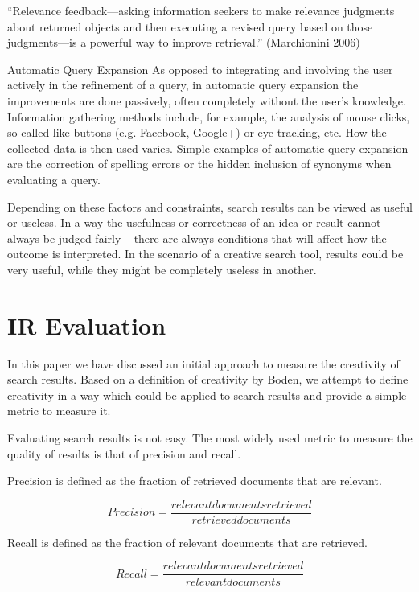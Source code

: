 ``Relevance feedback—asking information seekers to make relevance judgments about returned objects and then executing a revised query based on those judgments—is a powerful way to improve retrieval.'' (Marchionini 2006)

Automatic Query Expansion   As opposed to integrating and involving the user actively in the refinement of a query, in automatic query expansion the improvements are done passively, often completely without the user’s knowledge. Information gathering methods include, for example, the analysis of mouse clicks, so called like buttons (e.g. Facebook, Google+) or eye tracking, etc. How the collected data is then used varies. Simple examples of automatic query expansion are the correction of spelling errors or the hidden inclusion of synonyms when evaluating a query.

Depending on these factors and constraints, search results can be viewed as useful or useless. In a way the usefulness or correctness of an idea or result cannot always be judged fairly – there are always conditions that will affect how the outcome is interpreted. In the scenario of a creative search tool, results could be very useful, while they might be completely useless in another.


\section{IR Evaluation}

In this paper \parencite{Sawle2011} we have discussed an initial approach to measure the creativity of search results. Based on a definition of creativity by Boden, we attempt to define creativity in a way which could be applied to search results and provide a simple metric to measure it.

Evaluating search results is not easy. The most widely used metric to measure the quality of results is that of precision and recall.

Precision is defined as the fraction of retrieved documents that are relevant.

\begin{equation}
  Precision = \frac{relevant documents retrieved}{retrieved documents}
  \label{eq:precision}
\end{equation}

Recall is defined as the fraction of relevant documents that are retrieved.

\begin{equation}
  Recall = \frac{relevant documents retrieved}{relevant documents}
  \label{eq:recall}
\end{equation}

